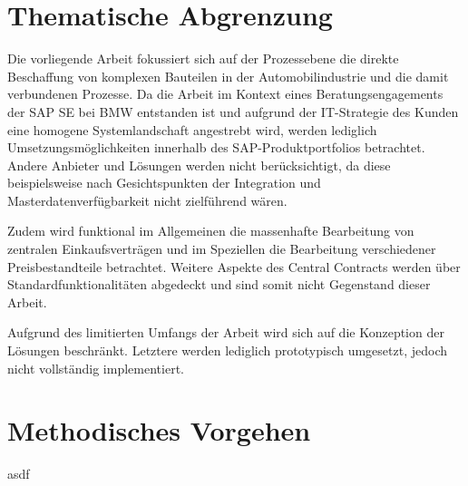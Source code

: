
\section{Thematische Abgrenzung}

Die vorliegende Arbeit fokussiert sich auf der Prozessebene die direkte Beschaffung von komplexen Bauteilen in der Automobilindustrie und die damit verbundenen Prozesse. Da die Arbeit im Kontext eines Beratungsengagements der SAP SE bei BMW entstanden ist und aufgrund der IT-Strategie des Kunden eine homogene Systemlandschaft angestrebt wird, werden lediglich Umsetzungsmöglichkeiten innerhalb des SAP-Produktportfolios betrachtet. Andere Anbieter und Lösungen werden nicht berücksichtigt, da diese beispielsweise nach Gesichtspunkten der Integration und Masterdatenverfügbarkeit nicht zielführend wären. 

Zudem wird funktional im Allgemeinen die massenhafte Bearbeitung von zentralen Einkaufsverträgen und im Speziellen die Bearbeitung verschiedener Preisbestandteile betrachtet. Weitere Aspekte des Central Contracts werden über Standardfunktionalitäten abgedeckt und sind somit nicht Gegenstand dieser Arbeit.

Aufgrund des limitierten Umfangs der Arbeit wird sich auf die Konzeption der Lösungen beschränkt. Letztere werden lediglich prototypisch umgesetzt, jedoch nicht vollständig implementiert.


\section{Methodisches Vorgehen}

asdf

